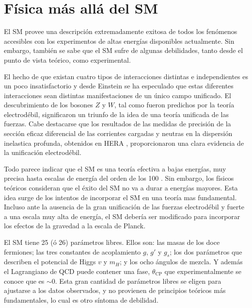 \section{Física más allá del SM}

El SM provee una descripción extremadamente exitosa de todos los fenómenos
accesibles con los experimentos de altas energías disponibles actualmente.
Sin embargo,
también se sabe que el SM sufre de algunas debilidades, tanto desde el punto de
vista teórico, como experimental.

El hecho de que existan cuatro tipos de interacciones distintas e independientes
es un poco insatisfactorio y desde Einstein se ha especulado que estas
diferentes interacciones sean distintas manifestaciones de un único campo
unificado. El descubrimiento de los bosones $Z$ y $W$, tal como fueron predichos
por la teoría electrodébil, significaron un triunfo de la idea de una teoría unificada de las
fuerzas. Cabe destacarse que los resultados de las medidas de precisión de la sección
eficaz diferencial de las corrientes cargadas y neutras en la dispersión inelastica
profunda, obtenidos en HERA \cite{Hera}, proporcionaron una clara evidencia de la unificación
electrodébil.

Todo parece indicar que el SM es una teoría efectiva a bajas energías, muy precisa hasta
escalas de energía del orden de los 100 {\gev}. Sin embargo, los físicos
teóricos consideran que el éxito del SM no va a durar a energías mayores. Esta
idea surge de los intentos de incorporar el SM en una teoría mas
fundamental. Incluso ante la ausencia de la gran unificación de las fuerzas
electrodébil y fuerte a una escala muy alta de energía, el SM debería ser
modificado para incorporar los efectos de la gravedad a la escala de Planck.

El SM tiene 25 (ó 26) parámetros libres. Ellos son: las masas de los doce fermiones;
las tres constantes de acoplamiento $g$, $g'$ y $g_s$; los dos parámetros que
describen el potencial de Higgs $v$ y $m_H$; y los ocho ángulos de mezcla. Y
además el Lagrangiano de QCD puede contener una fase, $\theta_{\text{CP}}$ que
experimentalmente se conoce que es $\sim 0$. Esta gran cantidad de parámetros
libres se eligen para ajustarse a los datos observados, y no provienen de
principios teóricos más fundamentales, lo cual es otro síntoma de debilidad.

